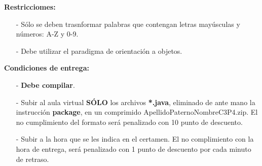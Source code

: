 \documentclass[10pt]{article}
\begin{document}
{\begin{enumerate}
\textbf{Restricciomes:}
\begin{itemize}
    \item[-] S\'olo se deben trasnformar palabras que contengan letras may\'usculas y n\'umeros: A-Z y 0-9.
    \item[-] Debe utilizar el paradigma de orientaci\'on a objetos.
\end{itemize}

\textbf{Condiciones de entrega:}
\begin{itemize}
    \item[-] \textbf{Debe compilar}.  
    \item[-] Subir al aula virtual \textbf{S\'OLO} los archivos \textbf{*.java}, eliminado de ante mano la instrucci\'on \textbf{package}, en un comprimido ApellidoPaternoNombreC3P4.zip. El no cumplimiento del formato ser\'a penalizado con 10 punto de descuento.
    \item[-] Subir a la hora que se les indica en el certamen. El no complimiento con la hora de entrega, ser\'a penalizado con 1 punto de descuento por cada minuto de retraso.
\end{itemize}


\end{enumerate}
}
\end{document}
